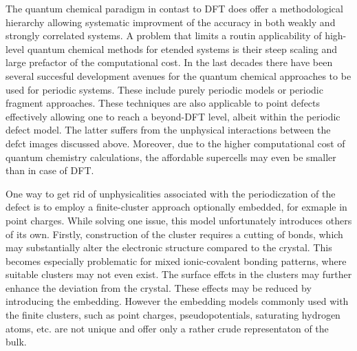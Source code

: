 \documentclass[a4paper,11pt,headings=normal]{scrartcl}
\begin{document}
The quantum chemical paradigm in contast to DFT does offer a methodological hierarchy allowing systematic improvment of the accuracy in both weakly and strongly correlated systems. A problem that limits a routin applicability of high-level quantum chemical methods for etended systems is their steep scaling and large prefactor of the computational cost. In the last decades there have been several succesful development avenues for the quantum chemical approaches to be used for periodic systems. These include purely periodic models\cite{..} or periodic fragment approaches.\cite{..} These techniques are also applicable to point defects effectively allowing one to reach a beyond-DFT level, albeit within the periodic defect model. The latter suffers from the unphysical interactions between the defct images discussed above. Moreover, due to the higher computational cost of quantum chemistry calculations, the affordable supercells may even be smaller than in case of DFT.

One way to get rid of unphysicalities associated with the periodiczation of the defect is to employ a finite-cluster approach\cite{..} optionally embedded, for exmaple in point charges.\cite{..} While solving one issue, this model unfortunately introduces others of its own. Firstly, construction of the cluster requires a cutting of bonds, which may substantially alter the electronic structure compared to the crystal. This becomes especially problematic for mixed ionic-covalent bonding patterns, where suitable clusters may not even exist. The surface effcts in the clusters may further enhance the deviation from the crystal. These effects may be reduced by introducing the embedding. However the embedding models commonly used with the finite clusters, such as point charges, pseudopotentials, saturating hydrogen atoms, etc. are not unique and offer only a rather crude representaton of the bulk.\cite{..}
\end{document}
